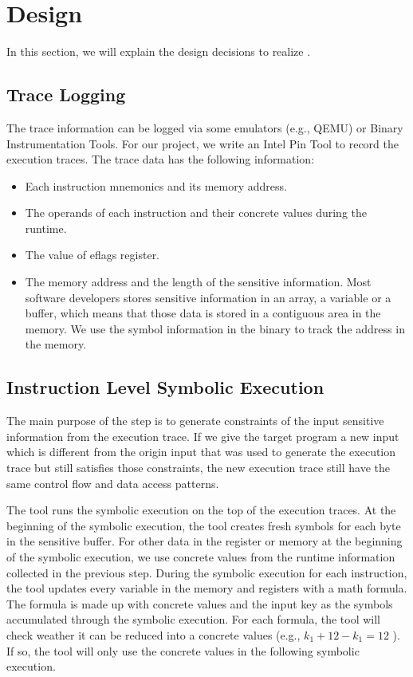 \section{Design}
In this section, we will explain the design decisions to realize \tool{}. 


\subsection{Trace Logging}
The trace information can be logged via some emulators (e.g., QEMU) or 
Binary Instrumentation Tools. 
For our project, we write an Intel Pin Tool to record the execution traces. 
The trace data has the following information:
\begin{itemize}
    \item Each instruction mnemonics and its memory address.
    \item The operands of each instruction and their concrete values during the 
          runtime.
    \item The value of eflags register. 
    \item The memory address and the length of the sensitive information.
     Most software developers stores sensitive information in an array,
     a variable or a buffer, which means that those data is stored in a contiguous 
     area in the memory. We use the symbol information in the binary to track the 
     address in the memory.

\end{itemize}

\subsection{Instruction Level Symbolic Execution}
The main purpose of the step is to generate 
constraints of the input sensitive information from the execution trace. 
If we give the target program a new input which 
is different from the origin input that was used 
to generate the execution trace but still satisfies those constraints,
the new execution trace still have the same control flow and 
data access patterns. 

The tool runs the symbolic execution on the top of the execution traces.
At the beginning of the symbolic execution, the tool creates fresh 
symbols for each byte in the sensitive buffer. For other data in the 
register or memory at the beginning of the symbolic execution,
we use concrete values from the runtime information collected in
the previous step. During the symbolic execution for each instruction, 
the tool updates every variable in the memory and registers with a
math formula. The formula is made up with concrete values and 
the input key as the symbols accumulated through the symbolic execution.
For each formula, the tool will check weather it can be reduced
into a concrete values (e.g., $k_1+12-k_1 = 12$ ). 
If so, the tool will only use the concrete values in the 
following symbolic execution.

